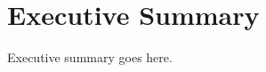 \documentclass[11pt]{article}
\begin{document}
\section*{Executive Summary}
Executive summary goes here.

\newpage
\tableofcontents
\listoffigures
\listoftables

\newpage












\newpage


\newpage
%




\end{document}
